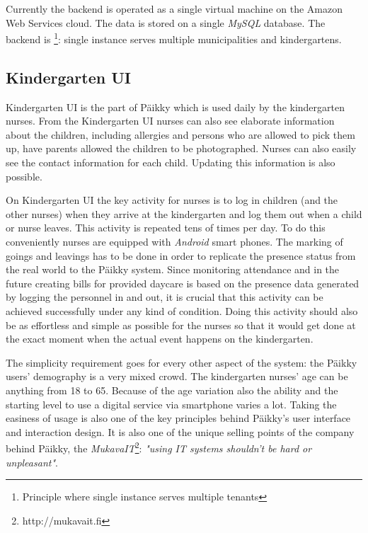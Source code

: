 Currently the backend is operated as a single virtual machine on the Amazon Web Services cloud. The data is stored on a single \textit{MySQL} database. The backend is \footnote{Principle where single instance serves multiple tenants}: single instance serves multiple municipalities and kindergartens. 






\subsection{Kindergarten UI}

Kindergarten UI is the part of Päikky which is used daily by the kindergarten nurses. From the Kindergarten UI nurses can also see elaborate information about the children, including allergies and persons who are allowed to pick them up, have parents allowed the children to be photographed. Nurses can also easily see the contact information for each child. Updating this information is also possible. %

On Kindergarten UI the key activity for nurses is to log in children (and the other nurses) when they arrive at the kindergarten and log them out when a child or nurse leaves. This activity is repeated tens of times per day. To do this conveniently nurses are equipped with \textit{Android} smart phones. The marking of goings and leavings has to be done in order to replicate the presence status from the real world to the Päikky system. Since monitoring attendance and in the future creating bills for provided daycare is based on the presence data generated by logging the personnel in and out, it is crucial that this activity can be achieved successfully under any kind of condition. Doing this activity should also be as effortless and simple as possible for the nurses so that it would get done at the exact moment when the actual event happens on the kindergarten. 

The simplicity requirement goes for every other aspect of the system: the Päikky users' demography is a very mixed crowd. The kindergarten nurses' age can be anything from 18 to 65. Because of the age variation also the ability and the starting level to use a digital service via smartphone varies a lot. Taking the easiness of usage is also one of the key principles behind Päikky's user interface and interaction design. It is also one of the unique selling points of the company behind Päikky, the \textit{MukavaIT}\footnote{http://mukavait.fi}: \textit{"using IT systems shouldn't be hard or unpleasant"}.

